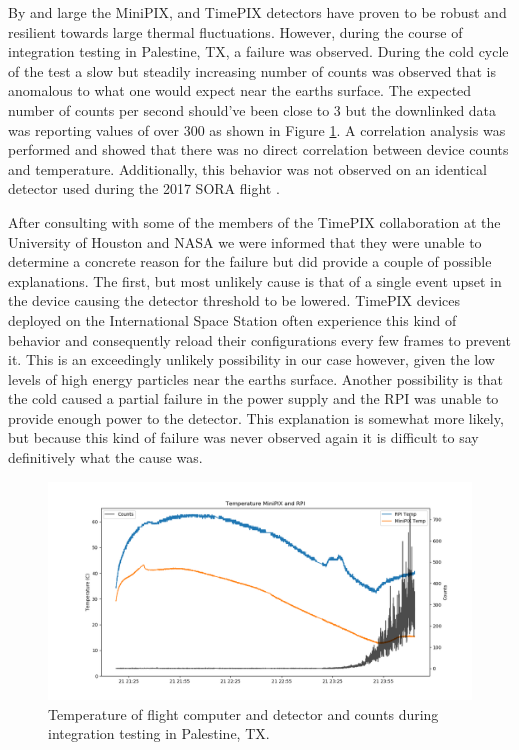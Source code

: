 By and large the MiniPIX, and TimePIX detectors have proven to be robust and resilient towards large thermal fluctuations. However, during the course of integration testing in Palestine, TX, a failure was observed. During the cold cycle of the test a slow but steadily increasing number of counts was observed that is anomalous to what one would expect near the earths surface. The expected number of counts per second should've been close to 3 but the downlinked data was reporting values of over 300 as shown in Figure \ref{fig:integrationtemps}.
A correlation analysis was performed and showed that there was no direct correlation between device counts and temperature. Additionally, this behavior was not observed on an identical detector used during the 2017 SORA flight \cite{SORA}. 

After consulting with some of the members of the TimePIX collaboration at the University of Houston and NASA we were informed that they were unable to determine a concrete reason for the failure but did provide a couple of possible explanations. The first, but most unlikely cause is that of a single event upset in the device causing the detector threshold to be lowered. TimePIX devices deployed on the International Space Station often experience this kind of behavior and consequently reload their configurations every few frames to prevent it. This is an exceedingly unlikely possibility in our case however, given the low levels of high energy particles near the earths surface. Another possibility is that the cold caused a partial failure in the power supply and the RPI was unable to provide enough power to the detector. This explanation is somewhat more likely, but because this kind of failure was never observed again it is difficult to say definitively what the cause was.

\begin{figure}[H]
	\begin{center}
	\includegraphics[width=\textwidth]{figures/tempsandcountsvtime.png}
	\caption{Temperature of flight computer and detector and counts during integration testing in Palestine, TX.}
	\label{fig:integrationtemps}
	\end{center}
\end{figure}

